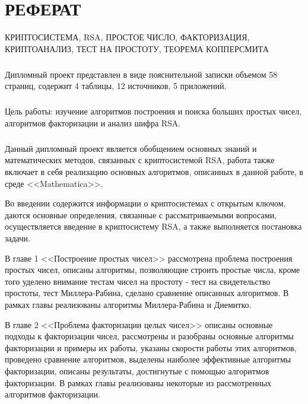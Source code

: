 
\newpage
\chapter*{РЕФЕРАТ}

КРИПТОСИСТЕМА, RSA, ПРОСТОЕ ЧИСЛО, ФАКТОРИЗАЦИЯ, КРИПТОАНАЛИЗ, ТЕСТ НА ПРОСТОТУ, ТЕОРЕМА КОППЕРСМИТА

\paragraph{} Дипломный проект представлен в виде пояснительной записки объемом 58 страниц, содержит 4 таблицы, 12 источников, 5 приложений.

\paragraph{} Цель работы: изучение алгоритмов построения и поиска больших простых чисел, алгоритмов факторизации и анализ шифра RSA.

\paragraph{} Данный дипломный проект является обобщением основных знаний и математических методов, связанных с криптосистемой RSA, работа также
	включает в себя реализацию основных алгоритмов, описанных в данной работе, в среде <<Mathematica>>.	

	Во введении содержится информации о криптосистемах с открытым ключом, даются основные определения, связанные с рассматриваемыми вопросами,
	осуществляется введение в криптосистему RSA, а также выполняется постановка задачи.

	В главе 1 <<Построение простых чисел>> рассмотрена проблема построения простых чисел, описаны алгоритмы, позволяющие строить простые числа, 
	кроме того уделено внимание тестам чисел на простоту - тест на свидетельство простоты, тест Миллера-Рабина, сделано сравнение описанных алгоритмов. В рамках 
	главы реализованы алгоритмы Миллера-Рабина и Диемитко.

	В главе 2 <<Проблема факторизации целых чисел>> описаны основные подходы к факторизации чисел, рассмотрены и разобраны основные алгоритмы факторизации и примеры их работы, указаны скорости работы этих алгоритмов, проведено сравнение алгоритмов, выделены наиболее эффективные алгоритмы факторизации, описаны результаты, достигнутые с помощью алгоритмов факторизации. В рамках главы реализованы некоторые из рассмотренных алгоритмов факторизации.

